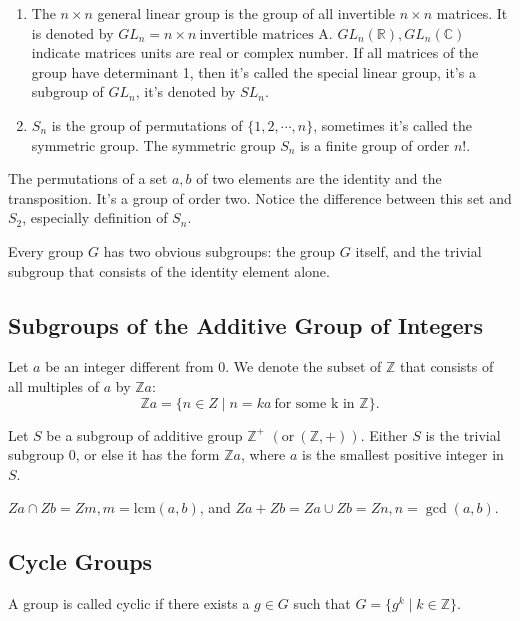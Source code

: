 \documentclass{tufte-handout}
\newcommand{\Z}{\mathbb{Z}}
\begin{document}
\begin{enumerate}
	
	\item The $n\times n$ general linear group is the group of all invertible $n\times n$ matrices. It is denoted by $GL_n = {n\times n~\text{invertible matrices A}}$. $GL_n(\mathbb{R}), GL_n(\mathbb{C})$ indicate matrices units are real or complex number. If all matrices of the group have determinant 1, then it's called the special linear group, it's a subgroup of $GL_n$, it's denoted by $SL_n$.
	\item $S_n$ is the group of permutations of $\{1, 2,\cdots,n\}$, sometimes it's called the symmetric group. The symmetric group $S_n$ is a finite group of order $n!$.
\end{enumerate}

The permutations of a set ${a, b}$ of two elements are the identity and the transposition. It's a group of order two. Notice the difference between this set and $S_2$, especially definition of $S_n$.

Every group $G$ has two obvious subgroups: the group $G$ itself, and the trivial subgroup that consists of the identity element alone.

\subsection{Subgroups of the Additive Group of Integers}

Let $a$ be an integer different from 0. We denote the subset of $\mathbb{Z}$ that consists of all multiples of $a$ by $\mathbb{Z}a$: 
\begin{equation}
	\Z a =\{n\in Z\mid n=ka~\text{for some k in } \Z\}.
\end{equation}

\begin{theorem}
	\normalfont
	Let $S$ be a subgroup of additive group $\Z^{+}$ $(\mathrm{or}~(\Z, +))$. Either $S$ is the trivial subgroup ${0}$, or else it has the form $\Z a$, where $a$ is the smallest positive integer in $S$.
\end{theorem}

$Za\cap Zb=Zm, m=\mathrm{lcm}(a, b)$, and $Za + Zb=Za\cup Zb=Zn, n = \gcd(a, b)$.

\subsection{Cycle Groups}

A group is called cyclic if there exists a $g\in G$ such that $G=\{g^k\mid k\in \Z\}$.
\end{document}
